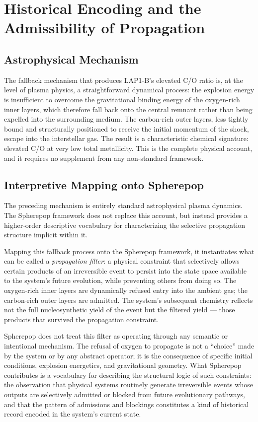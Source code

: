 \documentclass[12pt, a4paper]{article}
\theoremstyle{definition}
\begin{document}
\section{Historical Encoding and the Admissibility of Propagation}
\label{sec:admissibility}

\subsection{Astrophysical Mechanism}

The fallback mechanism that produces LAP1-B's elevated C/O ratio is, at the
level of plasma physics, a straightforward dynamical process: the explosion
energy is insufficient to overcome the gravitational binding energy of the
oxygen-rich inner layers, which therefore fall back onto the central remnant
rather than being expelled into the surrounding medium. The carbon-rich outer
layers, less tightly bound and structurally positioned to receive the
initial momentum of the shock, escape into the interstellar gas. The result
is a characteristic chemical signature: elevated C/O at very low total
metallicity. This is the complete physical account, and it requires no
supplement from any non-standard framework.

\subsection{Interpretive Mapping onto Spherepop}

The preceding mechanism is entirely standard astrophysical plasma dynamics.
The Spherepop framework does not replace this account, but instead provides
a higher-order descriptive vocabulary for characterizing the selective
propagation structure implicit within it.

Mapping this fallback process onto the Spherepop framework, it instantiates
what can be called a \emph{propagation filter}: a physical constraint that
selectively allows certain products of an irreversible event to persist into
the state space available to the system's future evolution, while preventing
others from doing so. The oxygen-rich inner layers are dynamically refused
entry into the ambient gas; the carbon-rich outer layers are admitted. The
system's subsequent chemistry reflects not the full nucleosynthetic yield of
the event but the filtered yield --- those products that survived the
propagation constraint.

Spherepop does not treat this filter as operating through any semantic or
intentional mechanism. The refusal of oxygen to propagate is not a ``choice''
made by the system or by any abstract operator; it is the consequence of
specific initial conditions, explosion energetics, and gravitational geometry.
What Spherepop contributes is a vocabulary for describing the structural logic
of such constraints: the observation that physical systems routinely generate
irreversible events whose outputs are selectively admitted or blocked from
future evolutionary pathways, and that the pattern of admissions and blockings
constitutes a kind of historical record encoded in the system's current state.
\end{document}
